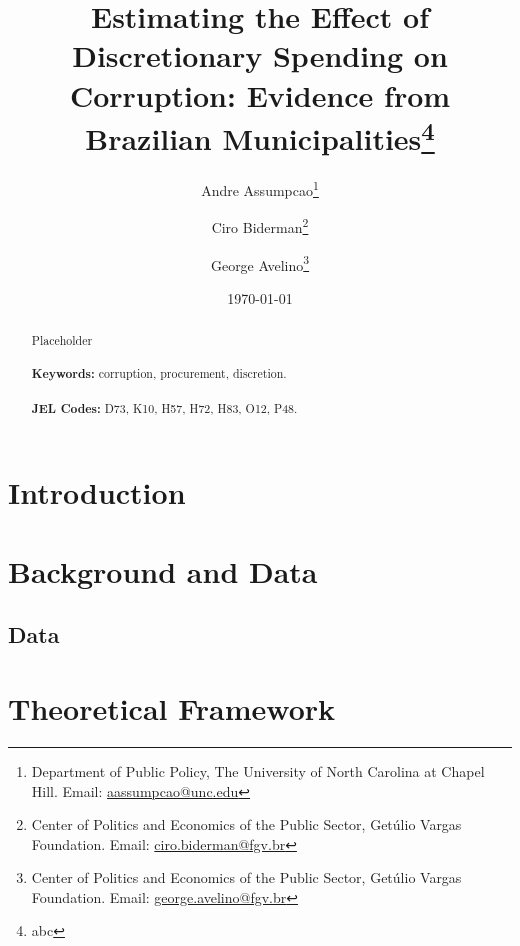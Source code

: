 \documentclass[11pt]{article}
\begin{document}
\begin{titlepage}
\title{Estimating the Effect of Discretionary Spending on Corruption: Evidence from Brazilian Municipalities\thanks{abc}}
\author{Andre Assumpcao\thanks{Department of Public Policy, The University of North Carolina at Chapel Hill. Email: \href{mailto:aassumpcao@unc.edu}{aassumpcao@unc.edu}} \and Ciro Biderman\thanks{Center of Politics and Economics of the Public Sector, Getúlio Vargas Foundation. Email: \href{mailto:ciro.biderman@fgv.br}{ciro.biderman@fgv.br}} \and George Avelino\thanks{Center of Politics and Economics of the Public Sector, Getúlio Vargas Foundation. Email: \href{mailto:george.avelino@fgv.br}{george.avelino@fgv.br}}}
\date{\today}
\maketitle
\begin{abstract}
\noindent Placeholder\\
\vspace{0in}\\
\noindent\textbf{Keywords:} corruption, procurement, discretion.\\
\vspace{0in}\\
\noindent\textbf{JEL Codes:} D73, K10, H57, H72, H83, O12, P48.\\

\bigskip
\end{abstract}
\setcounter{page}{0}
\thispagestyle{empty}
\end{titlepage}
\pagebreak \newpage

\singlespacing

\section{Introduction} \label{sec:introduction}

\section{Background and Data} \label{sec:background}

\subsection{Data} \label{sec:data}

\section{Theoretical Framework} \label{sec:theory}
\end{document}
